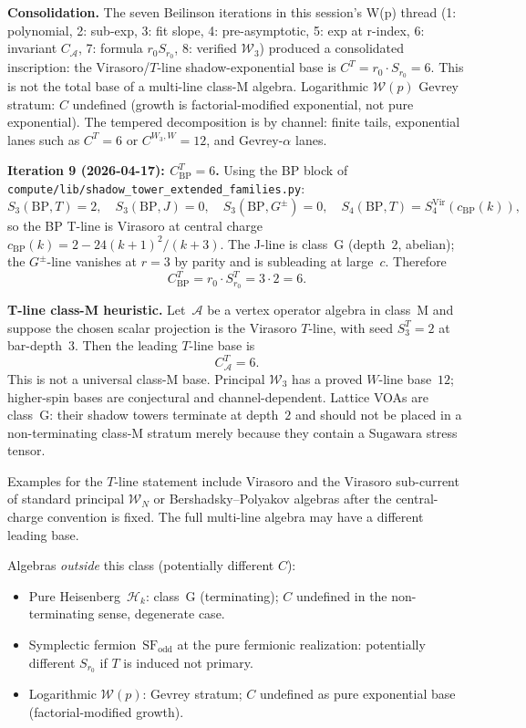 \documentclass[11pt]{article}
\newcommand{\cA}{\mathcal{A}}
\newcommand{\cW}{\mathcal{W}}
\newcommand{\cH}{\mathcal{H}}
\begin{document}
\textbf{Consolidation.} The seven Beilinson iterations in this
session's W(p) thread (1: polynomial, 2: sub-exp, 3: fit slope,
4: pre-asymptotic, 5: exp at r-index, 6: invariant $C_\cA$,
7: formula $r_0 S_{r_0}$, 8: verified $\cW_3$) produced a
consolidated inscription: the Virasoro/$T$-line
shadow-exponential base is $C^T = r_0 \cdot S_{r_0}=6$.
This is not the total base of a multi-line class-M algebra.
Logarithmic $\cW(p)$ Gevrey stratum: $C$ undefined (growth is
factorial-modified exponential, not pure exponential).  The
tempered decomposition is by channel: finite tails, exponential
lanes such as $C^T=6$ or $C^{W_3,W}=12$, and
Gevrey-$\alpha$ lanes.

\textbf{Iteration 9 (2026-04-17): $C_{\mathrm{BP}}^T = 6$.}
Using the BP block of
\verb|compute/lib/shadow_tower_extended_families.py|:
\[
  S_3(\mathrm{BP}, T) = 2,\quad
  S_3(\mathrm{BP}, J) = 0,\quad
  S_3(\mathrm{BP}, G^\pm) = 0, \quad
  S_4(\mathrm{BP}, T) = S_4^{\mathrm{Vir}}(c_{\mathrm{BP}}(k)),
\]
so the BP T-line is Virasoro at central charge~$c_{\mathrm{BP}}(k) =
2 - 24(k+1)^2/(k+3)$. The J-line is class~G (depth~$2$, abelian);
the $G^\pm$-line vanishes at $r=3$ by parity and is subleading at
large~$c$. Therefore
\[
  C_{\mathrm{BP}}^T = r_0 \cdot S_{r_0}^T = 3 \cdot 2 = 6.
\]

\textbf{T-line class-M heuristic.}
Let~$\cA$ be a vertex operator algebra in class~M and suppose the
chosen scalar projection is the Virasoro $T$-line, with seed
$S_3^T=2$ at bar-depth~$3$.  Then the leading $T$-line base is
\[
  C_\cA^T = 6.
\]
This is not a universal class-M base.  Principal $\cW_3$ has a
proved $W$-line base~$12$; higher-spin bases are conjectural and
channel-dependent.  Lattice VOAs are class~G: their shadow towers
terminate at depth~$2$ and should not be placed in a non-terminating
class-M stratum merely because they contain a Sugawara stress tensor.

Examples for the $T$-line statement include Virasoro and the
Virasoro sub-current of standard principal $\cW_N$ or
Bershadsky--Polyakov algebras after the central-charge convention is
fixed.  The full multi-line algebra may have a different leading
base.

Algebras \emph{outside} this class (potentially different $C$):
\begin{itemize}
  \item Pure Heisenberg~$\cH_k$: class~G (terminating); $C$ undefined
        in the non-terminating sense, degenerate case.
  \item Symplectic fermion~$\mathrm{SF}_{\mathrm{odd}}$ at the pure
        fermionic realization: potentially different $S_{r_0}$ if $T$
        is induced not primary.
  \item Logarithmic $\cW(p)$: Gevrey stratum; $C$ undefined as pure
        exponential base (factorial-modified growth).
\end{itemize}
\end{document}
